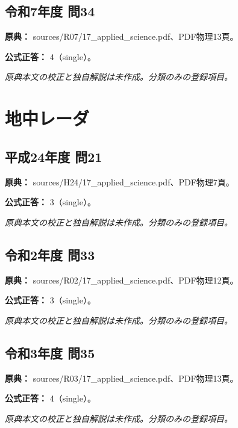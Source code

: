 \subsection{令和7年度 問34}
\label{q:r07-reg-applied-34}

\noindent\textbf{原典：} sources/R07/17\_applied\_science.pdf、PDF物理13頁。

\textbf{公式正答：} 4（single）。

\par\textit{原典本文の校正と独自解説は未作成。分類のみの登録項目。}

\section{地中レーダ}

\subsection{平成24年度 問21}
\label{q:h24-reg-applied-21}

\noindent\textbf{原典：} sources/H24/17\_applied\_science.pdf、PDF物理7頁。

\textbf{公式正答：} 3（single）。

\par\textit{原典本文の校正と独自解説は未作成。分類のみの登録項目。}

\subsection{令和2年度 問33}
\label{q:r02-reg-applied-33}

\noindent\textbf{原典：} sources/R02/17\_applied\_science.pdf、PDF物理12頁。

\textbf{公式正答：} 3（single）。

\par\textit{原典本文の校正と独自解説は未作成。分類のみの登録項目。}

\subsection{令和3年度 問35}
\label{q:r03-reg-applied-35}

\noindent\textbf{原典：} sources/R03/17\_applied\_science.pdf、PDF物理13頁。

\textbf{公式正答：} 4（single）。

\par\textit{原典本文の校正と独自解説は未作成。分類のみの登録項目。}

